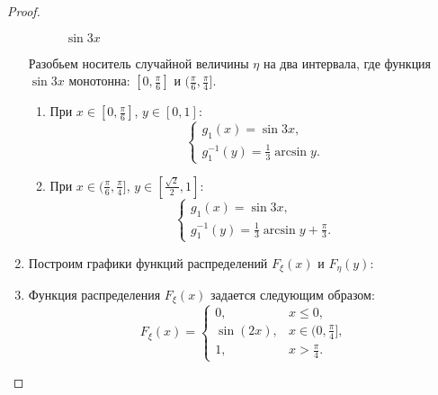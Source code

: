 \begin{proof}
\begin{enumerate}
          \begin{figure}[h!]
            \centering
            \caption{$\sin 3x$}
            \label{fig:hw2:ind:5}
          \end{figure}

          Разобьем носитель случайной величины $ \eta $ на два интервала, где функция $\sin 3x$ монотонна: $ [0, \frac{\pi}{6}] $ и $ (\frac{\pi}{6}, \frac{\pi}{4}] $.

          \begin{enumerate}
            \item При $ x \in [0, \frac{\pi}{6}] $, $ y \in [0, 1]$:
                  \[
                    \begin{cases}
                      g_1(x) = \sin 3x, \\
                      g_1^{-1}(y) = \frac{1}{3}\arcsin y.
                    \end{cases}
                  \]
            \item При $ x \in (\frac{\pi}{6}, \frac{\pi}{4}] $, $ y \in [\frac{\sqrt 2}{2}, 1]$:
                  \[
                    \begin{cases}
                      g_1(x) = \sin 3x, \\
                      g_1^{-1}(y) = \frac{1}{3}\arcsin y + \frac{\pi}{3}.
                    \end{cases}
                  \]
          \end{enumerate}

          

    \item Построим графики функций распределений $ F_{\xi}(x) $ и $ F_{\eta}(y) $:
    \item Функция распределения $ F_{\xi}(x) $ задается следующим образом:
          \[
            F_{\xi}(x) =
            \begin{cases}
              0,        & x \leqslant 0,            \\
              \sin(2x), & x \in (0, \frac{\pi}{4}], \\
              1,        & x > \frac{\pi}{4}.
            \end{cases}
          \]


\end{enumerate}
\end{proof}
